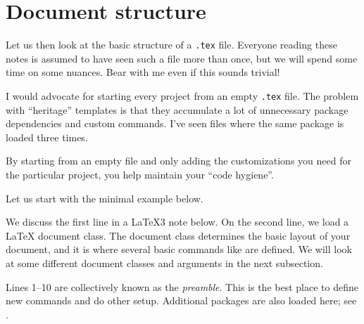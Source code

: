 


%
%
%
\section{Document structure}\label{sec:document structure}

Let us then look at the basic structure of a \verb|.tex| file.
Everyone reading these notes is assumed to have seen such a file more than once,
but we will spend some time on some nuances.
Bear with me even if this sounds trivial!

\begin{practices}
I would advocate for starting every project from an empty \verb|.tex| file.
The problem with ``heritage'' templates is that they accumulate a lot
of unnecessary package dependencies and custom commands.
I've seen files where the same package is loaded three times.

By starting from an empty file
and only adding the customizations you need for the particular project,
you help maintain your ``code hygiene''.
\end{practices}

Let us start with the minimal example below.


We discuss the first line in a \LaTeX3 note below.
On the second line, we load a \LaTeX{} document class.
The document class determines the basic layout of your document,
and it is where several basic commands like  are defined.
We will look at some different document classes and arguments in the next subsection.

Lines 1--10 are collectively known as the \emph{preamble}.
This is the best place to define new commands and do other setup.
Additional packages are also loaded here; see .

